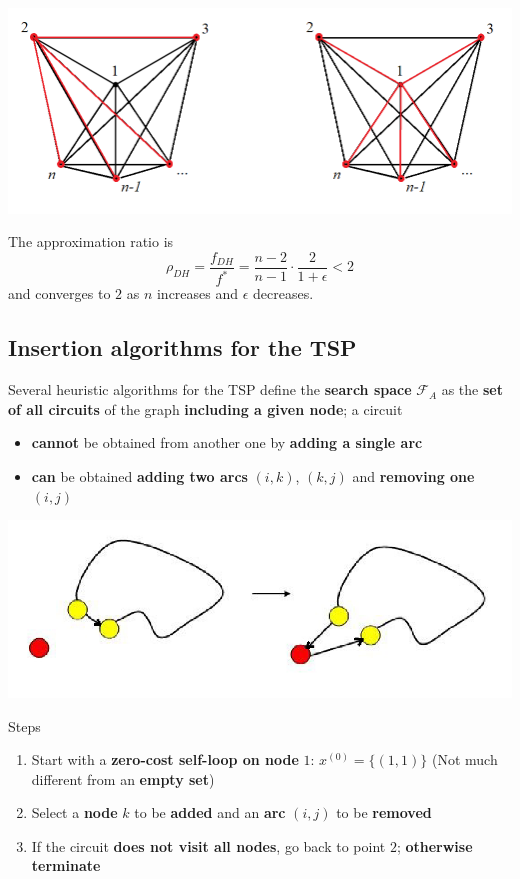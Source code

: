 \begin{center}
	\includegraphics[width=0.9\columnwidth]{img/STP3}
\end{center}

The approximation ratio is 
$$ \rho_{DH} = \frac{f_{DH}}{f^\ast} = \frac{n-2}{n-1} \cdot \frac{2}{1 + \epsilon} < 2 $$
and converges to $2$ as $n$ increases and $\epsilon$ decreases.\\

\newpage

\subsection{Insertion algorithms for the TSP}
Several heuristic algorithms for the TSP define the \textbf{search space} $\mathcal{F}_A$ as the \textbf{set of all circuits} of the graph \textbf{including a given node}; a circuit
\begin{itemize}
	\item \textbf{cannot} be obtained from another one by \textbf{adding a single arc}
	\item \textbf{can} be obtained \textbf{adding two arcs} $(i, k)$, $(k, j)$ and \textbf{removing one} $(i, j)$
\end{itemize}

\begin{center}
	\includegraphics[width=0.8\columnwidth]{img/IATSP1}
\end{center}

Steps
\begin{enumerate}
	\item Start with a \textbf{zero-cost self-loop on node} $1$: $x^{(0)} = \{(1, 1)\}$ (Not much different from an \textbf{empty set})
	
	\item Select a \textbf{node} $k$ to be \textbf{added} and an \textbf{arc} $(i, j)$ to be \textbf{removed}
	
	\item If the circuit \textbf{does not visit all nodes}, go back to point $2$; \textbf{otherwise terminate}
\end{enumerate}

